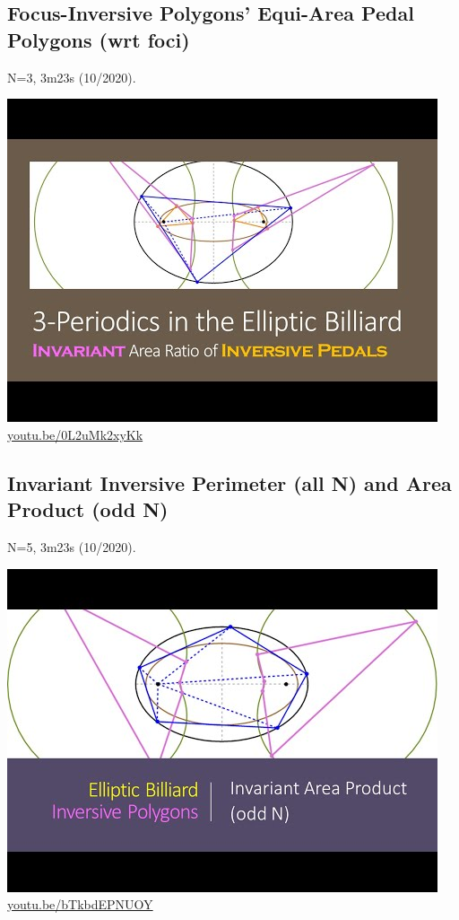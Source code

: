 \documentclass[12pt]{amsart}
\begin{document}
\subsection{Focus-Inversive Polygons' Equi-Area Pedal Polygons (wrt foci)}
\label{vid:0L2uMk2xyKk}
\noindent N=3, 3m23s (10/2020). 
\begin{center}\includegraphics[width=.5\textwidth]{pics/0L2uMk2xyKk.jpg} \\ 
\href{https://youtu.be/0L2uMk2xyKk}{\url{youtu.be/0L2uMk2xyKk}}\end{center}
% 

\subsection{Invariant Inversive Perimeter (all N) and Area Product (odd N)}
\label{vid:bTkbdEPNUOY}
\noindent N=5, 3m23s (10/2020). 
\begin{center}\includegraphics[width=.5\textwidth]{pics/bTkbdEPNUOY.jpg} \\ 
\href{https://youtu.be/bTkbdEPNUOY}{\url{youtu.be/bTkbdEPNUOY}}\end{center}
% 
\end{document}

